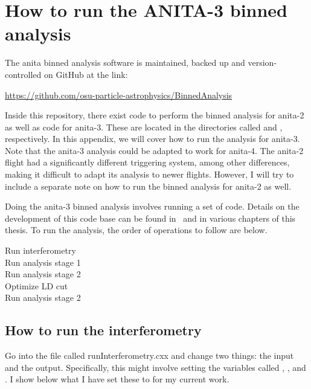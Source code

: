 \chapter{How to run the ANITA-3 binned analysis}

The \gls{anita} binned analysis software is maintained, backed up and version-controlled on GitHub at the link: 

\begin{center}
\href{https://github.com/osu-particle-astrophysics/BinnedAnalysis}{https://github.com/osu-particle-astrophysics/BinnedAnalysis} 
\end{center}

Inside this repository, there exist code to perform the binned analysis for \gls{anita}-2 as well as code for \gls{anita}-3. 
These are located in the directories called  and , respectively. 
In this appendix, we will cover how to run the analysis for \gls{anita}-3. Note that the \gls{anita}-3 analysis could be adapted to work for \gls{anita}-4. The \gls{anita}-2 flight had a significantly different triggering system, among other differences, making it difficult to adapt its analysis to newer flights. However, I will try to include a separate note on how to run the binned analysis for \gls{anita}-2 as well. 

Doing the \gls{anita}-3 binned analysis involves running a set of code. Details on the development of this code base can be found in~\cite{brianDaileyThesis,samStaffordThesis,jacobGordonThesis} and in various chapters of this thesis. 
To run the analysis, the order of operations to follow are below. 

\begin{center}
Run interferometry\\
Run analysis stage 1\\
Run analysis stage 2\\
Optimize LD cut\\
Run analysis stage 2 

\end{center}

\section{How to run the interferometry}

Go into the file called runInterferometry.cxx and change two things: the input and the output. Specifically, this might involve setting the variables called , , and . I show below what I have set these to for my current work. 


